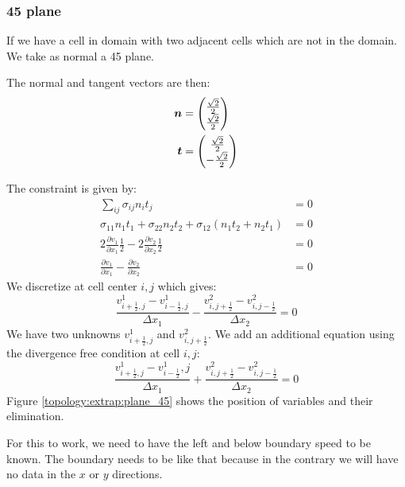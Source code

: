 \subsubsection{\unit{45}{\degree} plane}

If we have a cell in domain with two adjacent cells which are not in the domain.
We take as normal a \unit{45}{\degree} plane.

The normal and tangent vectors are then:
\begin{align}
	{\boldsymbol {n}}&=\begin{pmatrix}
	\frac{\sqrt{2}}{2}\\
	\frac{\sqrt{2}}{2}
	\end{pmatrix}\\
	{\boldsymbol {t}}&=\begin{pmatrix}
			\frac{\sqrt{2}}{2}\\
			-\frac{\sqrt{2}}{2}
		\end{pmatrix}
\end{align}

The constraint is given by:
\begin{align}
	\sum_{ij}\sigma_{ij}n_{i}t_{j}&=0\\
	\sigma_{11}n_{1}t_{1}+\sigma_{22}n_{2}t_{2}+\sigma_{12}(n_{1}t_{2}+n_{2}t_{1})&=0\\
	2\frac{\partial v_{1}}{\partial x_{1}}\frac{1}{2}-2\frac{\partial v_{2}}{\partial x_{2}}\frac{1}{2}&=0\\
	\frac{\partial v_{1}}{\partial x_{1}}-\frac{\partial v_{2}}{\partial x_{2}}&=0
\end{align}
We discretize at cell center $i,j$ which gives:
\begin{equation}
	\frac{v^{1}_{i+\frac{1}{2},j}-v^{1}_{i-\frac{1}{2},j}}{\Delta x_{1}}-\frac{v^{2}_{i,j+\frac{1}{2}}-v^{2}_{i,j-\frac{1}{2}}}{\Delta x_{2}}=0
\end{equation}
We have two unknowns $v^{1}_{i+\frac{1}{2},j}$ and $v^{2}_{i,j+\frac{1}{2}}$.
We add an additional equation using the divergence free condition at cell $i,j$:
\begin{equation}
	\frac{v^{1}_{i+\frac{1}{2},j}-v^{1}_{i-\frac{1}{2}},j}{\Delta x_{1}}+\frac{v^{2}_{i,j+\frac{1}{2}}-v^{2}_{i,j-\frac{1}{2}}}{\Delta x_2}=0
\end{equation}
Figure \ref{topology:extrap:plane_45} shows the position of variables and  their elimination.

For this to work, we need to have the left and below boundary speed to be known.
The boundary needs to be like that because in the contrary we will have no data in the $x$ or $y$ directions.

